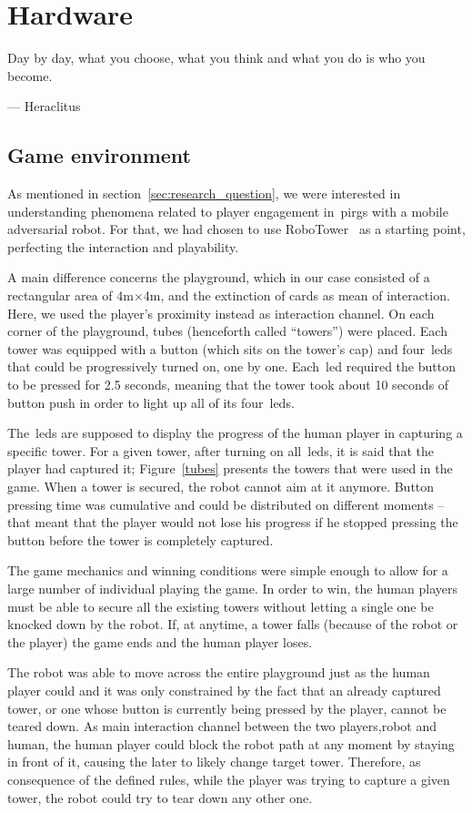\chapter{Hardware}\label{ch:foundation}
\epigraph{Day by day, what you choose, what you think and what you do is who you become.}{--- Heraclitus}
\section{Game environment}\label{sec:game_environment}
As mentioned in section~\ref{sec:research_question}, we were interested in understanding phenomena related to player engagement in~\gls{pirg}s with a mobile adversarial robot. For that, we had chosen to use RoboTower~\citep{bonarini_timing_2014} as a starting point, perfecting the interaction and playability.

A main difference concerns the playground, which in our case consisted of a rectangular area of 4m$\times$4m, and the extinction of cards as mean of interaction. Here, we used the player's proximity instead as interaction channel. On each corner of the playground, tubes (henceforth called ``towers'') were placed. Each tower was equipped with a button (which sits on the tower's cap) and four~\gls{led}s that could be progressively turned on, one by one.  Each~\gls{led} required the button to be pressed for 2.5 seconds, meaning that the tower took about 10 seconds of button push in order to light up all of its four~\gls{led}s.

The~\gls{led}s are supposed to display the progress of the human player in capturing a specific tower. For a given tower, after turning on all~\gls{led}s, it is said that the player had captured it; Figure~\ref{tubes} presents the towers that were used in the game. When a tower is secured, the robot cannot aim at it anymore.
Button pressing time was cumulative and could be distributed on different moments -- that meant that the player would not lose his progress if he stopped pressing the button before the tower is completely captured. 

The game mechanics and winning conditions were simple enough to allow for a large number of individual playing the game. In order to win, the human players must be able to secure all the existing towers without letting a single one be knocked down by the robot. If, at anytime, a tower falls (because of the robot or the player) the game ends and the human player loses. 

The robot was able to move across the entire playground just as the human player could and it was only constrained by the fact that an already captured tower, or one whose button is currently being pressed by the player, cannot be teared down. As main interaction channel between the two players,\ie robot and human, the human player could block the robot path at any moment by staying in front of it, causing the later to likely change target tower. Therefore, as consequence of the defined rules, while the player was trying to capture a given tower, the robot could try to tear down any other one.

